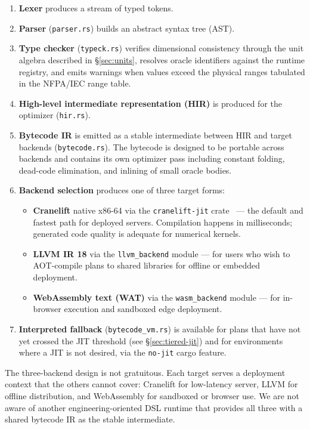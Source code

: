 \documentclass[11pt,a4paper]{article}
\begin{document}
\begin{enumerate}[leftmargin=*]
\item \textbf{Lexer} produces a stream of typed tokens.
\item \textbf{Parser} (\texttt{parser.rs}) builds an abstract syntax tree (AST).
\item \textbf{Type checker} (\texttt{typeck.rs}) verifies dimensional consistency through the unit algebra described in \S\ref{sec:units}, resolves oracle identifiers against the runtime registry, and emits warnings when values exceed the physical ranges tabulated in the NFPA/IEC range table.
\item \textbf{High-level intermediate representation (HIR)} is produced for the optimizer (\texttt{hir.rs}).
\item \textbf{Bytecode IR} is emitted as a stable intermediate between HIR and target backends (\texttt{bytecode.rs}). The bytecode is designed to be portable across backends and contains its own optimizer pass including constant folding, dead-code elimination, and inlining of small oracle bodies.
\item \textbf{Backend selection} produces one of three target forms:
  \begin{itemize}
  \item \textbf{Cranelift} native x86-64 via the \texttt{cranelift-jit} crate~\cite{cranelift} --- the default and fastest path for deployed servers. Compilation happens in milliseconds; generated code quality is adequate for numerical kernels.
  \item \textbf{LLVM IR 18} via the \texttt{llvm\_backend} module --- for users who wish to AOT-compile plans to shared libraries for offline or embedded deployment.
  \item \textbf{WebAssembly text (WAT)} via the \texttt{wasm\_backend} module --- for in-browser execution and sandboxed edge deployment.
  \end{itemize}
\item \textbf{Interpreted fallback} (\texttt{bytecode\_vm.rs}) is available for plans that have not yet crossed the JIT threshold (see \S\ref{sec:tiered-jit}) and for environments where a JIT is not desired, via the \texttt{no-jit} cargo feature.
\end{enumerate}

The three-backend design is not gratuitous. Each target serves a deployment context that the others cannot cover: Cranelift for low-latency server, LLVM for offline distribution, and WebAssembly for sandboxed or browser use. We are not aware of another engineering-oriented DSL runtime that provides all three with a shared bytecode IR as the stable intermediate.
\end{document}
